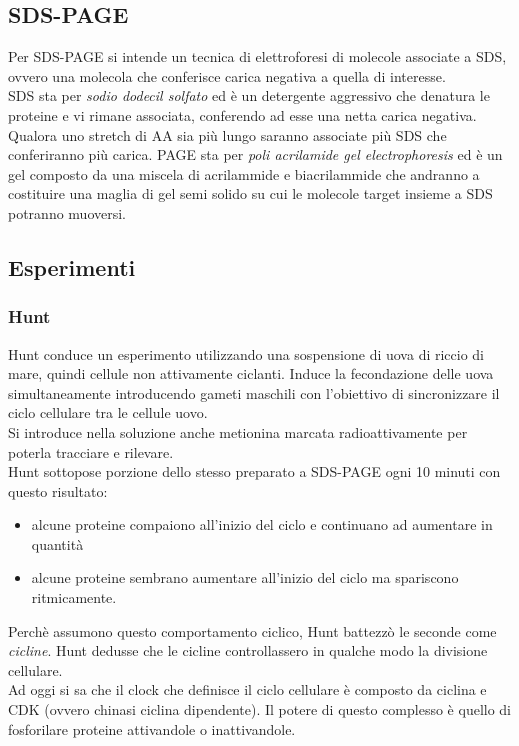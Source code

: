     \subsection{SDS-PAGE}
        Per SDS-PAGE si intende un tecnica di elettroforesi di molecole associate a SDS, ovvero una molecola che conferisce carica negativa a quella di interesse.\\
        SDS sta per \textit{sodio dodecil solfato} ed è un detergente aggressivo che denatura le proteine e vi rimane associata, conferendo ad esse una netta carica negativa. Qualora uno stretch di AA sia più lungo saranno associate più SDS che conferiranno più carica.
        PAGE sta per \textit{poli acrilamide gel electrophoresis} ed è un gel composto da una miscela di acrilammide e biacrilammide che andranno a costituire una maglia di gel semi solido su cui le molecole target insieme a SDS potranno muoversi.
    
    \subsection{Esperimenti}
        \subsubsection{Hunt}
            Hunt conduce un esperimento utilizzando una sospensione di uova di riccio di mare, quindi cellule non attivamente ciclanti. 
            Induce la fecondazione delle uova simultaneamente introducendo gameti maschili con l'obiettivo di sincronizzare il ciclo cellulare tra le cellule uovo.\\
            Si introduce nella soluzione anche metionina marcata radioattivamente per poterla tracciare e rilevare.\\
            Hunt sottopose porzione dello stesso preparato a SDS-PAGE ogni 10 minuti con questo risultato:
            \begin{itemize}
                \item alcune proteine compaiono all'inizio del ciclo e continuano ad aumentare in quantità
                \item alcune proteine sembrano aumentare all'inizio del ciclo ma spariscono ritmicamente.
            \end{itemize}
            Perchè assumono questo comportamento ciclico, Hunt battezzò le seconde come \textit{cicline}. Hunt dedusse che le cicline controllassero in qualche modo la divisione cellulare. \\
            Ad oggi si sa che il clock che definisce il ciclo cellulare è composto da ciclina e CDK (ovvero chinasi ciclina dipendente). Il potere di questo complesso è quello di fosforilare proteine attivandole o inattivandole.
        
